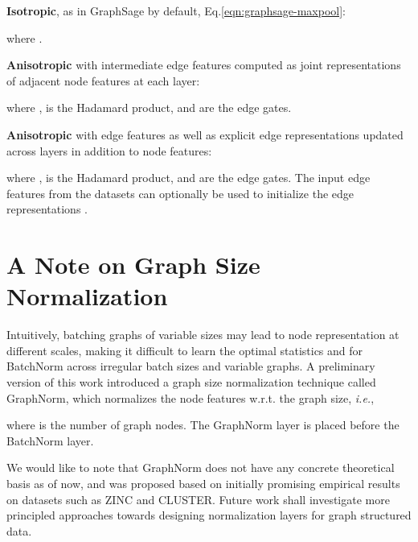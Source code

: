 \documentclass{article}
\begin{document}
\textbf{Isotropic}, as in GraphSage by default, Eq.\eqref{eqn:graphsage-maxpool}:

where .

\textbf{Anisotropic} with intermediate edge features computed as joint representations of adjacent node features at each layer:

where ,  is the Hadamard product, and  are the edge gates.

\textbf{Anisotropic} with edge features as well as explicit edge representations updated across layers in addition to node features:

where ,  is the Hadamard product, and  are the edge gates.
The input edge features from the datasets can optionally be used to initialize the edge representations .







\section{A Note on Graph Size Normalization}
Intuitively, batching graphs of variable sizes may lead to node representation at different scales, making it difficult to learn the optimal statistics  and  for BatchNorm across irregular batch sizes and variable graphs. 
A preliminary version of this work introduced a graph size normalization technique called GraphNorm, which normalizes the node features   w.r.t. the graph size, \textit{i.e.}, 

where  is the number of graph nodes. 
The GraphNorm layer is placed before the BatchNorm layer.

We would like to note that GraphNorm does not have any concrete theoretical basis as of now, and was proposed based on initially promising empirical results on datasets such as ZINC and CLUSTER.
Future work shall investigate more principled approaches towards designing normalization layers for graph structured data.
\end{document}
